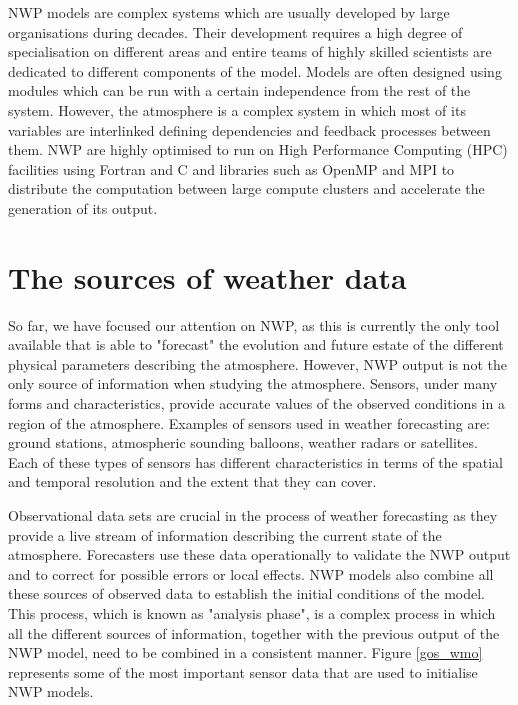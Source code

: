 \medskip

NWP models are complex systems which are usually developed by large organisations during decades. Their development requires a high degree of specialisation on different areas and entire teams of highly skilled scientists are dedicated to different components of the model. Models are often designed using modules which can be run with a certain independence from the rest of the system. However, the atmosphere is a complex system in which most of its variables are interlinked defining dependencies and feedback processes between them. NWP are highly optimised to run on High Performance Computing (HPC) facilities using Fortran and C and libraries such as OpenMP \citep{dagum1998openmp} and MPI \citep{gropp1999using} to distribute the computation between large compute clusters and accelerate the generation of its output. 


\section{The sources of weather data}

So far, we have focused our attention on NWP, as this is currently the only tool available that is able to "forecast" the evolution and future estate of the different physical parameters describing the atmosphere. However, NWP output is not the only source of information when studying the atmosphere. Sensors, under many forms and characteristics, provide accurate values of the observed conditions in a region of the atmosphere. Examples of sensors used in weather forecasting are: ground stations, atmospheric sounding balloons, weather radars or satellites. Each of these types of sensors has different characteristics in terms of the spatial and temporal resolution and the extent that they can cover.

\medskip

Observational data sets are crucial in the process of weather forecasting as they provide a live stream of information describing the current state of the atmosphere. Forecasters use these data operationally to validate the NWP output and to correct for possible errors or local effects. NWP models also combine all these sources of observed data to establish the initial conditions of the model. This process, which is known as "analysis phase", is a complex process in which all the different sources of information, together with the previous output of the NWP model, need to be combined in a consistent manner. Figure \ref{gos_wmo} represents some of the most important sensor data that are used to initialise NWP models.

